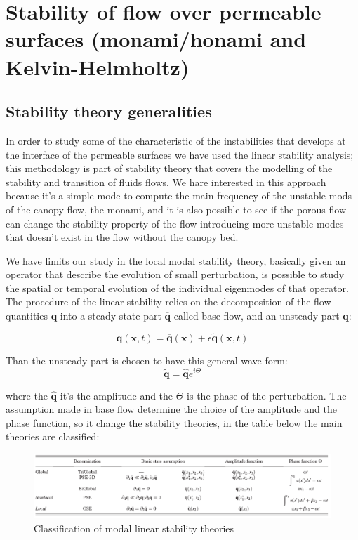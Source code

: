 \section{Stability of flow over permeable surfaces (monami/honami and Kelvin-Helmholtz)}
\label{sec:stability}

\citet{finnigan2000turbulence} \citet{jimenez2001turbulent}

\subsection{Stability theory generalities}

In order to study some of the characteristic of the instabilities that develops at the interface of the permeable surfaces we have used the linear stability analysis; this methodology is part of stability theory that covers the modelling of the stability and transition of fluids flows.
We hare interested in this approach because it's a simple mode to compute the main frequency of the unstable mods of the canopy flow, the monami, and it is also possible to see if the porous flow can change the stability property of the flow introducing more unstable modes that doesn't exist in the flow without the canopy bed. 
 
We have limits our study in the local modal stability theory, basically given an operator that describe the evolution of small perturbation, is possible to study the spatial or temporal evolution of the individual eigenmodes of that operator.
The procedure of the linear stability relies on the decomposition of the flow quantities $\mathbf{q}$ into a steady state part $\overline{\mathbf{q}}$ called base flow, and an unsteady part $\widetilde{\mathbf{q}}$:

$$ \mathbf{q} (\mathbf{x},t)= \overline{\mathbf{q}} (\mathbf{x}) + \epsilon \widetilde{\mathbf{q}} (\mathbf{x},t) $$

Than the unsteady part is chosen to have this general wave form:
$$  \widetilde{\mathbf{q}} =  \widehat{\mathbf{q}} e^{i\Theta} $$

where the $\widehat{\mathbf{q}}$ it's the amplitude and the $\Theta$ is the phase of the perturbation.
The assumption made in base flow determine the choice of the amplitude and the phase function, so it change the stability theories, in the table below the main theories are classified:

\begin{figure}[h]
	\centering
	\includegraphics[width=1\linewidth]{chapter_1/table}
	\caption{Classification of modal linear stability theories}
	\label{fig:table}
\end{figure}

